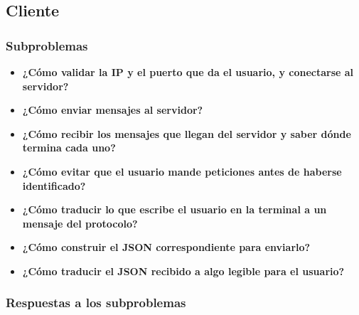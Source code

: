 \documentclass{article}
\begin{document}
\subsection{Cliente}

\subsubsection{Subproblemas}

\begin{itemize}
    \item \textbf{¿Cómo validar la IP y el puerto que da el usuario, y conectarse al servidor?}

    \item \textbf{¿Cómo enviar mensajes al servidor?}

    \item \textbf{¿Cómo recibir los mensajes que llegan del servidor y saber dónde termina cada uno?}

    \item \textbf{¿Cómo evitar que el usuario mande peticiones antes de haberse identificado?}

    \item \textbf{¿Cómo traducir lo que escribe el usuario en la terminal a un mensaje del protocolo?}

    \item \textbf{¿Cómo construir el JSON correspondiente para enviarlo?}

    \item \textbf{¿Cómo traducir el JSON recibido a algo legible para el usuario?}
\end{itemize}

\subsubsection{Respuestas a los subproblemas}
\end{document}
